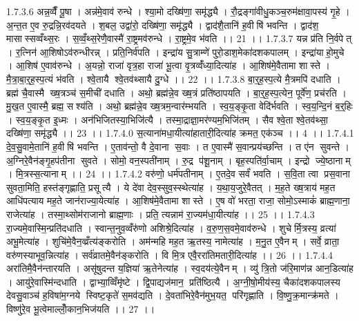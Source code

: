 1.7.3.6
अन्न॒व्वैँ पू॒षा । अन्न॑मे॒वाव॑ रुन्धे । श्या॒मो दख्षि॑णा॒ समृ॑द्ध्यै । रौ॒द्रङ्गा॑वीधु॒कञ्च॒रुम॑क्षावा॒पस्य॑ गृ॒हे । अ॒न्त॒त ए॒व रु॒द्रन्नि॒रव॑दयते । श॒बल॒ उद्वा॑रो॒ दख्षि॑णा॒ समृ॑द्ध्यै । द्वाद॑शै॒तानि॑ ह॒वीषि॑ भवन्ति । द्वाद॑श॒ मासास्सव्वँथ्स॒रः । स॒व्वँ॒थ्स॒रेणै॒वास्मै॑ रा॒ष्ट्रमव॑रुन्धे । रा॒ष्ट्रमे॒व भ॑वति ।। 21 ।।
1.7.3.7
यन्न प्र॑ति नि॒र्वपेत् । र॒त्निन॑ आ॒शिषोऽव॑रुन्धीरन्न् । प्रति॒निर्व॑पति । इन्द्रा॑य सु॒त्राम्णे॑ पुरो॒डाश॒मेका॑दशकपालम् । इन्द्रा॑याहो॒मुचे । आ॒शिष॑ ए॒वाव॑रुन्धे । अ॒यन्नो॒ राजा॑ वृत्र॒हा राजा॑ भू॒त्वा वृ॒त्रव्वँ॑ध्या॒दित्या॑ह । आ॒शिष॑मे॒वैतामा शास्ते । मै॒त्रा॒बा॒र्॒ह॒स्प॒त्यं भ॑वति । श्वे॒तायै श्वे॒तव॑थ्सायै दु॒ग्धे ।। 22 ।।
1.7.3.8
बा॒र्॒ह॒स्प॒त्ये मै॒त्रमपि॑ दधाति । ब्रह्म॑ चै॒वास्मै ख्ष॒त्रञ्च॑ स॒मीची॑ दधाति । अथो॒ ब्रह्म॑न्ने॒व ख्ष॒त्रं प्रति॑ष्ठापयति । बा॒र्॒ह॒स्प॒त्येन॒ पूर्वे॑ण॒ प्रच॑रति । मु॒ख॒त ए॒वास्मै॒ ब्रह्म॒ सश्य॑ति । अथो॒ ब्रह्म॑न्ने॒व ख्ष॒त्रम॒न्वार॑म्भयति । स्व॒य॒ङ्कृ॒ता वेदि॑र्भवति । स्व॒य॒न्दि॒नं ब॒र्॒हिः । स्व॒य॒ङ्कृ॒त इ॒ध्मः । अन॑भिजितस्या॒भिजि॑त्यै । तस्मा॒द्राज्ञा॒मर॑ण्यम॒भिजि॑तम् । सैव श्वे॒ता श्वे॒तव॑थ्सा॒ दख्षि॑णा॒ समृ॑द्ध्यै ।। 23 ।।
1.7.4.0
स॒त्याना॑मधा॒यीत्या॑हातारी॒दित्या॑ह क्रमत॒ एक॑ञ्च ।। 4 ।।
1.7.4.1
दे॒व॒सु॒वामे॒तानि॑ ह॒वीषि॑ भवन्ति । ए॒ताव॑न्तो॒ वै दे॒वाना॑ स॒वाः । त ए॒वास्मै॑ स॒वान्प्रय॑च्छन्ति । त ए॑न सुवन्ते । अ॒ग्निरे॒वैन॑ङ्गृ॒हप॑तीना सुवते । सोमो॒ वन॒स्पती॑नाम् । रु॒द्र प॑शू॒नाम् । बृह॒स्पति॑र्वा॒चाम् । इन्द्रो ज्ये॒ष्ठानाम् । मि॒त्रस्स॒त्यानाम् ।। 24 ।।
1.7.4.2
वरु॑णो॒ धर्म॑पतीनाम् । ए॒तदे॒व सर्वं॑ भवति । स॒वि॒ता त्वा प्रस॒वाना॑ सुवता॒मिति॒ हस्त॑ङ्गृह्णाति॒ प्रसूत्यै । ये दे॑वा देव॒स्सुव॒स्स्थेत्या॑ह । य॒था॒य॒जुरे॒वैतत् । म॒ह॒ते ख्ष॒त्राय॑ मह॒त आधि॑पत्याय मह॒ते जान॑राज्या॒येत्या॑ह । आ॒शिष॑मे॒वैतामा शास्ते । ए॒ष वो॑ भरता॒ राजा॒ सोमो॒ऽस्माकं॑ ब्राह्म॒णाना॒॒ राजेत्या॑ह । तस्मा॒थ्सोम॑राजानो ब्राह्म॒णाः । प्रति॒ त्यन्नाम॑ रा॒ज्यम॑धा॒यीत्या॑ह ।। 25 ।।
1.7.4.3
रा॒ज्यमे॒वास्मि॒न्प्रति॑दधाति । स्वान्त॒नुव॒व्वँरु॑णो अशिश्रे॒दित्या॑ह । व॒रु॒ण॒स॒वमे॒वाव॑रुन्धे । शुचेर्मि॒त्रस्य॒ व्रत्या॑ अभू॒मेत्या॑ह । शुचि॑मे॒वैन॒व्व्रँत्य॑ङ्करोति । अम॑न्महि मह॒त ऋ॒तस्य॒ नामेत्या॑ह । म॒नु॒त ए॒वैनम् । सर्वे॒ व्राता॒ वरु॑णस्याभूव॒न्नित्या॑ह । सर्व॑व्रातमे॒वैन॑ङ्करोति । वि मि॒त्र एवै॒ररा॑तिमतारी॒दित्या॑ह ।। 26 ।।
1.7.4.4
अरा॑तिमै॒वैन॑न्तारयति । असू॑षुदन्त य॒ज्ञिया॑ ऋ॒तेनेत्या॑ह । स्व॒दय॑त्ये॒वैनम् । व्यु॑ त्रि॒तो ज॑रि॒माण॑न्न आन॒डित्या॑ह । आयु॑रे॒वास्मि॑न्दधाति । द्वाभ्या॒व्विँमृ॑ष्टे । द्वि॒पाद्यज॑मान॒ प्रति॑ष्ठित्यै । अ॒ग्नी॒षो॒मीय॑स्य॒ चैका॑दशकपालस्य देवसु॒वाञ्च॑ ह॒विषा॑म॒ग्नये स्विष्ट॒कृते॑ स॒मव॑द्यति । दे॒वता॑भिरे॒वैन॑मुभ॒यत॒ परि॑गृह्णाति । वि॒ष्णु॒क्र॒मान्क्र॑मते । विष्णु॑रे॒व भू॒त्वेमाल्लोँ॒कान॒भिज॑यति ।। 27 ।।
